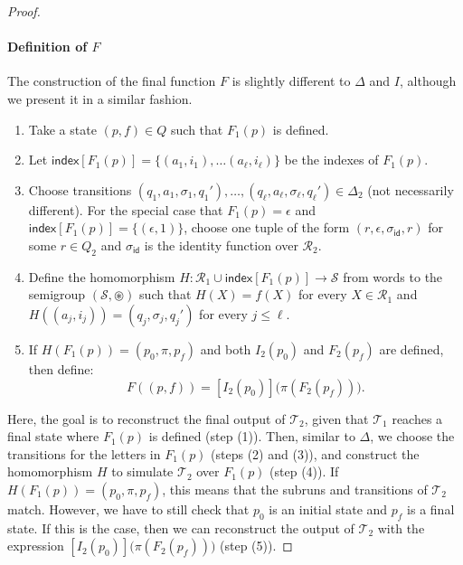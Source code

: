\documentclass[
a4paper
]{article}
\theoremstyle{plain}
\theoremstyle{definition}
\theoremstyle{remark}
\newcommand{\Reg}{\mathcal{R}}
\newcommand{\nsst}{\mathcal{T}}
\newcommand{\indx}{\operatorname{index}}
\renewcommand{\operatorname}[1]{\textsf{#1}}
\begin{document}
\begin{proof}
\paragraph{Definition of $F$} The construction of the final function $F$ is slightly different to $\Delta$ and $I$, although we present it in a similar fashion. 
\begin{enumerate}
	\item Take a state $(p, f) \in Q$ such that $F_1(p)$ is defined. 
	\item Let $\indx[F_1(p)] = \{(a_1, i_1), \ldots (a_\ell, i_\ell)\}$ be the indexes of $F_1(p)$.
	\item Choose transitions $(q_1, a_1, \sigma_1, q_1'), \ldots, (q_\ell, a_\ell, \sigma_\ell, q_\ell') \in \Delta_2$ (not necessarily different).
	For the special case that $F_1(p) = \epsilon$ and $\indx[F_1(p)] = \{(\epsilon, 1)\}$, choose one tuple of the form $(r, \epsilon, \sigma_{\operatorname{id}}, r)$ for some $r \in Q_2$ and $\sigma_{\operatorname{id}}$ is the identity function over $\Reg_2$.
	\item Define the homomorphism $H: \Reg_1 \cup \indx[F_1(p)] \to \mathcal{S}$ from words to the semigroup $(\mathcal{S}, \circledast)$ such that
	$H(X) = f(X)$ for every $X \in \Reg_1$ and $H((a_j, i_j)) = (q_j, \sigma_j, q_j')$ for every $j \leq \ell$. 
	\item If $H(F_1(p)) = (p_0, \pi, p_f)$ and both $I_2(p_0)$ and $F_2(p_f)$ are defined, then define: 
	$$
	F((p,f)) = [I_2(p_0)]\big(\pi(F_2(p_f))\big).
	$$
\end{enumerate}
Here, the goal is to reconstruct the final output of $\nsst_2$, given that $\nsst_1$ reaches a final state where $F_1(p)$ is defined (step (1)). Then, similar to $\Delta$, we choose the transitions for the letters in $F_1(p)$ (steps (2) and (3)), and construct the homomorphism $H$ to simulate $\nsst_2$ over $F_1(p)$ (step (4)). If $H(F_1(p)) = (p_0, \pi, p_f)$, this means that the subruns and transitions of $\nsst_2$ match. However, we have to still check that $p_0$ is an initial state and $p_f$ is a final state. If this is the case, then we can reconstruct the output of $\nsst_2$ with the expression $[I_2(p_0)]\big(\pi(F_2(p_f))\big)$ (step (5)).


\end{proof}
\end{document}
